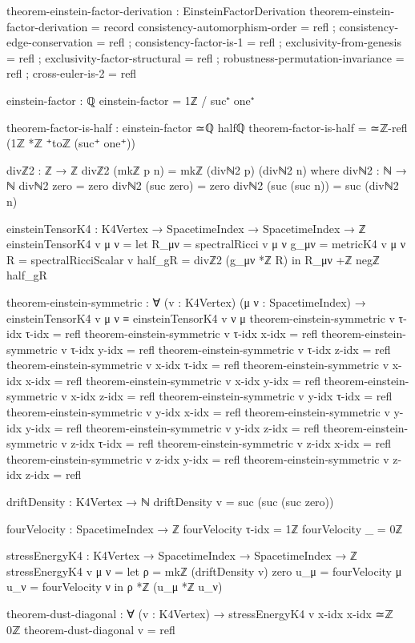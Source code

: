 \documentclass[11pt,a4paper]{book}
\begin{document}
\begin{code}
theorem-einstein-factor-derivation : EinsteinFactorDerivation
theorem-einstein-factor-derivation = record
  { consistency-automorphism-order = refl
  ; consistency-edge-conservation = refl
  ; consistency-factor-is-1 = refl
  ; exclusivity-from-genesis = refl
  ; exclusivity-factor-structural = refl
  ; robustness-permutation-invariance = refl
  ; cross-euler-is-2 = refl
  }


einstein-factor : ℚ
einstein-factor = 1ℤ / suc⁺ one⁺

theorem-factor-is-half : einstein-factor ≃ℚ halfℚ
theorem-factor-is-half = ≃ℤ-refl (1ℤ *ℤ ⁺toℤ (suc⁺ one⁺))

divℤ2 : ℤ → ℤ
divℤ2 (mkℤ p n) = mkℤ (divℕ2 p) (divℕ2 n)
  where
  divℕ2 : ℕ → ℕ
  divℕ2 zero = zero
  divℕ2 (suc zero) = zero
  divℕ2 (suc (suc n)) = suc (divℕ2 n)

einsteinTensorK4 : K4Vertex → SpacetimeIndex → SpacetimeIndex → ℤ
einsteinTensorK4 v μ ν = 
  let R_μν = spectralRicci v μ ν
      g_μν = metricK4 v μ ν
      R    = spectralRicciScalar v
      half_gR = divℤ2 (g_μν *ℤ R)
  in R_μν +ℤ negℤ half_gR

theorem-einstein-symmetric : ∀ (v : K4Vertex) (μ ν : SpacetimeIndex) →
                             einsteinTensorK4 v μ ν ≡ einsteinTensorK4 v ν μ
theorem-einstein-symmetric v τ-idx τ-idx = refl
theorem-einstein-symmetric v τ-idx x-idx = refl
theorem-einstein-symmetric v τ-idx y-idx = refl
theorem-einstein-symmetric v τ-idx z-idx = refl
theorem-einstein-symmetric v x-idx τ-idx = refl
theorem-einstein-symmetric v x-idx x-idx = refl
theorem-einstein-symmetric v x-idx y-idx = refl
theorem-einstein-symmetric v x-idx z-idx = refl
theorem-einstein-symmetric v y-idx τ-idx = refl
theorem-einstein-symmetric v y-idx x-idx = refl
theorem-einstein-symmetric v y-idx y-idx = refl
theorem-einstein-symmetric v y-idx z-idx = refl
theorem-einstein-symmetric v z-idx τ-idx = refl
theorem-einstein-symmetric v z-idx x-idx = refl
theorem-einstein-symmetric v z-idx y-idx = refl
theorem-einstein-symmetric v z-idx z-idx = refl

driftDensity : K4Vertex → ℕ
driftDensity v = suc (suc (suc zero))

fourVelocity : SpacetimeIndex → ℤ
fourVelocity τ-idx = 1ℤ
fourVelocity _     = 0ℤ

stressEnergyK4 : K4Vertex → SpacetimeIndex → SpacetimeIndex → ℤ
stressEnergyK4 v μ ν = 
  let ρ   = mkℤ (driftDensity v) zero
      u_μ = fourVelocity μ
      u_ν = fourVelocity ν
  in ρ *ℤ (u_μ *ℤ u_ν)

theorem-dust-diagonal : ∀ (v : K4Vertex) → stressEnergyK4 v x-idx x-idx ≃ℤ 0ℤ
theorem-dust-diagonal v = refl


\end{code}
\end{document}
